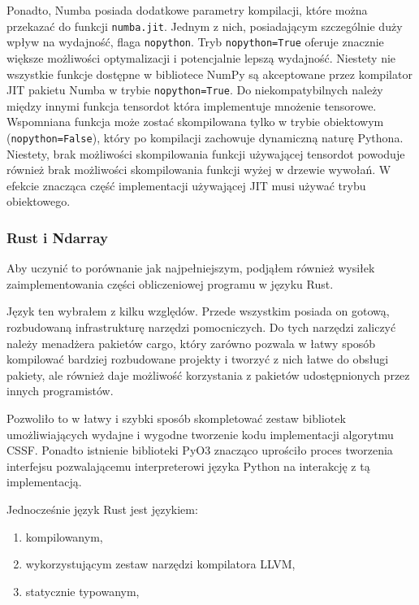 \documentclass[11pt, a4paper]{article}
\newcommand{\code}[1]{\texttt{#1}}
\begin{document}
\begin{sloppypar}
    Ponadto, Numba posiada dodatkowe parametry kompilacji, które można przekazać do
    funkcji \code{numba.jit}. Jednym z nich, posiadającym szczególnie duży wpływ na wydajność,
    flaga \code{nopython}. Tryb \code{nopython=True} oferuje znacznie większe możliwości
    optymalizacji i potencjalnie lepszą wydajność. Niestety nie wszystkie funkcje
    dostępne w bibliotece NumPy są akceptowane przez kompilator JIT pakietu Numba w
    trybie \code{nopython=True}. Do niekompatybilnych należy między innymi funkcja
    tensordot która implementuje mnożenie tensorowe. Wspomniana funkcja może zostać skompilowana
    tylko w trybie obiektowym (\code{nopython=False}), który po kompilacji zachowuje dynamiczną
    naturę Pythona. Niestety, brak możliwości skompilowania funkcji używającej tensordot
    powoduje również brak możliwości skompilowania funkcji wyżej w drzewie wywołań. W
    efekcie znacząca część implementacji używającej JIT musi używać trybu obiektowego.

    \subsubsection{Rust i Ndarray}
    Aby uczynić to porównanie jak najpełniejszym, podjąłem również wysiłek zaimplementowania
    części obliczeniowej programu w języku Rust.

    Język ten wybrałem z kilku względów. Przede wszystkim posiada on gotową, rozbudowaną
    infrastrukturę narzędzi pomocniczych. Do tych narzędzi zaliczyć należy menadżera
    pakietów cargo, który zarówno pozwala w łatwy sposób kompilować bardziej rozbudowane
    projekty i tworzyć z nich łatwe do obsługi pakiety, ale również daje możliwość
    korzystania z pakietów udostępnionych przez innych programistów.

    Pozwoliło to w łatwy i szybki sposób skompletować zestaw bibliotek umożliwiających
    wydajne i wygodne tworzenie kodu implementacji algorytmu CSSF. Ponadto istnienie biblioteki
    PyO3 znacząco uprościło proces tworzenia interfejsu pozwalającemu interpreterowi języka
    Python na interakcję z tą implementacją.

    Jednocześnie język Rust jest językiem:
    \begin{enumerate}
      \item kompilowanym,

      \item wykorzystującym zestaw narzędzi kompilatora LLVM,

      \item statycznie typowanym,


\end{enumerate}
\end{sloppypar}
\end{document}
